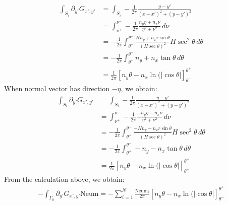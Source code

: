\documentclass[a4paper,12pt]{article}
\newcommand{\integ}[3]{%
\ensuremath{\displaystyle{\int^{#2}_{#1} #3}}}
\begin{document}
\begin{enumerate}
\begin{align}
 \integ{S_i}{}{\partial_{y'} G_{x',y'}}&=\integ{S_i}{}{-\frac{1}{2\pi}\frac{y-y'}{(x-x')^2+(y-y')^2}}\\
 &=\integ{\nu^+}{\nu^-}{-\frac{1}{2\pi} \frac{n_y\eta+n_x \nu}{\eta^2+\nu^2} \, d\nu}\\
&=-\frac{1}{2\pi}\integ{\theta^+}{\theta^-}{\frac{H n_y+n_x r \sin\theta}{\left( H\sec\theta\right)^2 }H \sec^2\theta \, d\theta}\\
&=-\frac{1}{2\pi}\integ{\theta^+}{\theta^-}{n_y+n_x\tan\theta\, d\theta}\\
&=\frac{1}{2\pi} \left[ n_y\theta -n_x \ln(\vert \cos\theta\vert \right]_{\theta^-}^{\theta^+} \label{intPartialyaG1}
\end{align}
When normal vector has direction $-\eta$, we obtain:
\begin{align}
 \integ{S_i}{}{\partial_{y'} G_{x',y'}}&=\integ{S_i}{}{-\frac{1}{2\pi}\frac{y-y'}{(x-x')^2+(y-y')^2}}\\
 &=\integ{\nu^+}{\nu^-}{-\frac{1}{2\pi} \frac{-n_y\eta-n_x \nu}{\eta^2+\nu^2} \, d\nu}\\
&=-\frac{1}{2\pi}\integ{\theta^+}{\theta^-}{\frac{-H n_y-n_x r \sin\theta}{\left( H\sec\theta\right)^2 }H \sec^2\theta \, d\theta}\\
&=-\frac{1}{2\pi}\integ{\theta^+}{\theta^-}{-n_y-n_x\tan\theta\, d\theta}\\
&=\frac{1}{2\pi} \left[ n_y\theta -n_x \ln(\vert \cos\theta\vert \right]_{\theta^-}^{\theta^+} \label{intPartialyaG11}
\end{align}
From the calculation above, we obtain:
\begin{align}
 -\integ{\Gamma_0}{}{\partial_{y'} G_{x',y'} \text{Neum}}=-\sum\limits_{i=1}^N \frac{\text{Neum}_i}{2\pi}\left[ n_y\theta -n_x \ln(\vert \cos\theta\vert \right]_{\theta^-}^{\theta^+} \label{intPartialyaG}
 \end{align}


\end{enumerate}
\end{document}
